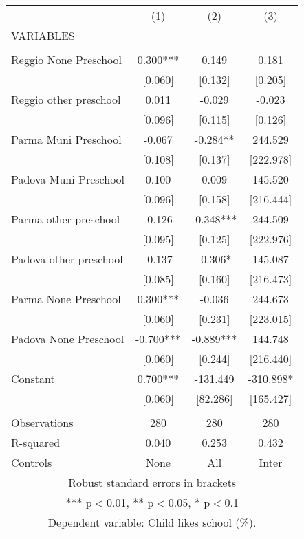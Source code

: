 \begin{tabular}{lccc} \hline
 & (1) & (2) & (3) \\
VARIABLES &  &  &  \\ \hline
 &  &  &  \\
Reggio None Preschool & 0.300*** & 0.149 & 0.181 \\
 & [0.060] & [0.132] & [0.205] \\
Reggio other preschool & 0.011 & -0.029 & -0.023 \\
 & [0.096] & [0.115] & [0.126] \\
Parma Muni Preschool & -0.067 & -0.284** & 244.529 \\
 & [0.108] & [0.137] & [222.978] \\
Padova Muni Preschool & 0.100 & 0.009 & 145.520 \\
 & [0.096] & [0.158] & [216.444] \\
Parma other preschool & -0.126 & -0.348*** & 244.509 \\
 & [0.095] & [0.125] & [222.976] \\
Padova other preschool & -0.137 & -0.306* & 145.087 \\
 & [0.085] & [0.160] & [216.473] \\
Parma None Preschool & 0.300*** & -0.036 & 244.673 \\
 & [0.060] & [0.231] & [223.015] \\
Padova None Preschool & -0.700*** & -0.889*** & 144.748 \\
 & [0.060] & [0.244] & [216.440] \\
Constant & 0.700*** & -131.449 & -310.898* \\
 & [0.060] & [82.286] & [165.427] \\
 &  &  &  \\
Observations & 280 & 280 & 280 \\
R-squared & 0.040 & 0.253 & 0.432 \\
 Controls & None & All & Inter \\ \hline
\multicolumn{4}{c}{ Robust standard errors in brackets} \\
\multicolumn{4}{c}{ *** p$<$0.01, ** p$<$0.05, * p$<$0.1} \\
\multicolumn{4}{c}{ Dependent variable: Child likes school (\%).} \\
\end{tabular}
